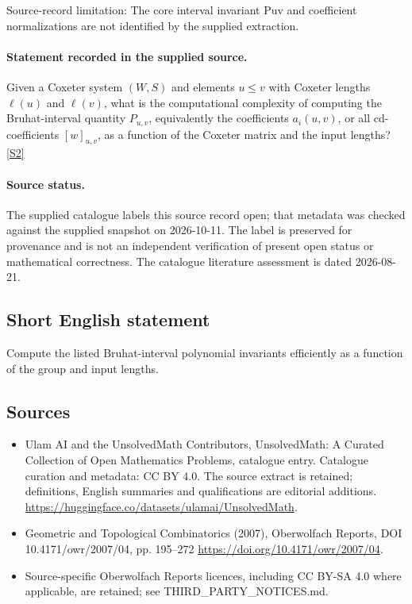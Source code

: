 \documentclass[11pt]{article}
\begin{document}
Source-record limitation: The core interval invariant Puv and coefficient normalizations are not identified by the supplied extraction.
\paragraph{Statement recorded in the supplied source.}
Given a Coxeter system $(W,S)$ and elements $u\leq v$ with Coxeter lengths $\ell(u)$ and $\ell(v)$, what is the computational complexity of computing the Bruhat-interval quantity $P_{u,v}$, equivalently the coefficients $a_i(u,v)$, or all cd-coefficients $[w]_{u,v}$, as a function of the Coxeter matrix and the input lengths? \href{https://doi.org/10.4171/owr/2007/04}{[S2]}
\paragraph{Source status.}
The supplied catalogue labels this source record open; that metadata was checked against the supplied snapshot on 2026-10-11. The label is preserved for provenance and is not an independent verification of present open status or mathematical correctness. The catalogue literature assessment is dated 2026-08-21.
\subsection{Short English statement}
Compute the listed Bruhat-interval polynomial invariants efficiently as a function of the group and input lengths.
\subsection{Sources}
\begin{itemize}
\item[S1] Ulam AI and the UnsolvedMath Contributors, UnsolvedMath: A Curated Collection of Open Mathematics Problems, catalogue entry. Catalogue curation and metadata: CC BY 4.0. The source extract is retained; definitions, English summaries and qualifications are editorial additions.
\url{https://huggingface.co/datasets/ulamai/UnsolvedMath}.
\item[S2] Geometric and Topological Combinatorics (2007), Oberwolfach Reports, DOI 10.4171/owr/2007/04, pp. 195--272
\url{https://doi.org/10.4171/owr/2007/04}.
\item Source-specific Oberwolfach Reports licences, including CC BY-SA 4.0 where applicable, are retained; see THIRD\_PARTY\_NOTICES.md.
\end{itemize}
\end{document}
